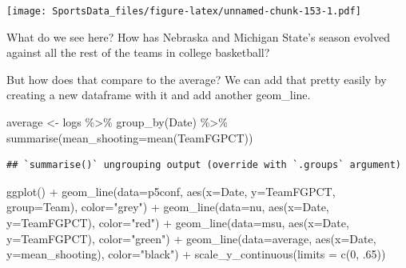 \documentclass[
]{book}
\newenvironment{Shaded}{\begin{snugshade}}{\end{snugshade}}
\newcommand{\AttributeTok}[1]{\textcolor[rgb]{0.77,0.63,0.00}{#1}}
\newcommand{\DecValTok}[1]{\textcolor[rgb]{0.00,0.00,0.81}{#1}}
\newcommand{\FunctionTok}[1]{\textcolor[rgb]{0.00,0.00,0.00}{#1}}
\newcommand{\NormalTok}[1]{#1}
\newcommand{\OtherTok}[1]{\textcolor[rgb]{0.56,0.35,0.01}{#1}}
\newcommand{\SpecialCharTok}[1]{\textcolor[rgb]{0.00,0.00,0.00}{#1}}
\newcommand{\StringTok}[1]{\textcolor[rgb]{0.31,0.60,0.02}{#1}}
\begin{document}
\texttt{[image: SportsData\_files/figure-latex/unnamed-chunk-153-1.pdf]}

What do we see here? How has Nebraska and Michigan State's season evolved against all the rest of the teams in college basketball?

But how does that compare to the average? We can add that pretty easily by creating a new dataframe with it and add another geom\_line.

\begin{Shaded}
\begin{Highlighting}[]
\NormalTok{average }\OtherTok{\textless{}{-}}\NormalTok{ logs }\SpecialCharTok{\%\textgreater{}\%} \FunctionTok{group\_by}\NormalTok{(Date) }\SpecialCharTok{\%\textgreater{}\%} \FunctionTok{summarise}\NormalTok{(}\AttributeTok{mean\_shooting=}\FunctionTok{mean}\NormalTok{(TeamFGPCT))}
\end{Highlighting}
\end{Shaded}

\begin{verbatim}
## `summarise()` ungrouping output (override with `.groups` argument)
\end{verbatim}

\begin{Shaded}
\begin{Highlighting}[]
\FunctionTok{ggplot}\NormalTok{() }\SpecialCharTok{+} \FunctionTok{geom\_line}\NormalTok{(}\AttributeTok{data=}\NormalTok{p5conf, }\FunctionTok{aes}\NormalTok{(}\AttributeTok{x=}\NormalTok{Date, }\AttributeTok{y=}\NormalTok{TeamFGPCT, }\AttributeTok{group=}\NormalTok{Team), }\AttributeTok{color=}\StringTok{"grey"}\NormalTok{) }\SpecialCharTok{+} \FunctionTok{geom\_line}\NormalTok{(}\AttributeTok{data=}\NormalTok{nu, }\FunctionTok{aes}\NormalTok{(}\AttributeTok{x=}\NormalTok{Date, }\AttributeTok{y=}\NormalTok{TeamFGPCT), }\AttributeTok{color=}\StringTok{"red"}\NormalTok{) }\SpecialCharTok{+} \FunctionTok{geom\_line}\NormalTok{(}\AttributeTok{data=}\NormalTok{msu, }\FunctionTok{aes}\NormalTok{(}\AttributeTok{x=}\NormalTok{Date, }\AttributeTok{y=}\NormalTok{TeamFGPCT), }\AttributeTok{color=}\StringTok{"green"}\NormalTok{) }\SpecialCharTok{+} \FunctionTok{geom\_line}\NormalTok{(}\AttributeTok{data=}\NormalTok{average, }\FunctionTok{aes}\NormalTok{(}\AttributeTok{x=}\NormalTok{Date, }\AttributeTok{y=}\NormalTok{mean\_shooting), }\AttributeTok{color=}\StringTok{"black"}\NormalTok{) }\SpecialCharTok{+} \FunctionTok{scale\_y\_continuous}\NormalTok{(}\AttributeTok{limits =} \FunctionTok{c}\NormalTok{(}\DecValTok{0}\NormalTok{, .}\DecValTok{65}\NormalTok{))}
\end{Highlighting}
\end{Shaded}
\end{document}
